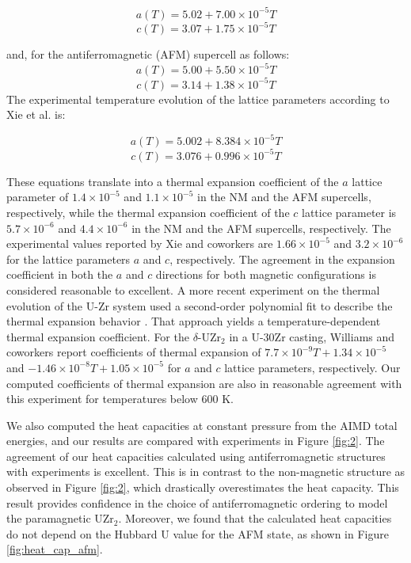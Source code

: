 \documentclass[preprint,12pt]{elsarticle}
\begin{document}
\[
 a(T) = 5.02 + 7.00 \times 10^{-5} T \]
 \[
 c(T) = 3.07 + 1.75 \times 10^{-5} T \]

\noindent and, for the antiferromagnetic (AFM) supercell as follows:
\[
 a(T) = 5.00 + 5.50 \times 10^{-5} T \]
 \[
 c(T) = 3.14 + 1.38 \times 10^{-5} T \]
 The experimental temperature evolution of the lattice parameters according to Xie et al. \cite{xie_phase_2022} is:

 \[
 a(T) = 5.002 + 8.384 \times 10^{-5} T \]
 \[
 c(T) = 3.076 + 0.996 \times 10^{-5} T \]

These equations translate into a thermal expansion coefficient of the $a$ lattice parameter of $1.4 \times 10^{-5}$ and $1.1 \times 10^{-5}$ in the NM and the AFM supercells, respectively, while the thermal expansion coefficient of the $c$ lattice parameter is $5.7 \times 10^{-6}$ and $4.4 \times 10^{-6}$ in the NM and the AFM supercells, respectively. The experimental values reported by Xie and coworkers are $1.66 \times 10^{-5}$   and  $3.2 \times 10^{-6}$  for the lattice parameters $a$ and $c$, respectively. The agreement in the expansion coefficient in both the $a$ and $c$ directions for both magnetic configurations is considered reasonable to excellent. A more recent experiment on the thermal evolution of the U-Zr system used a second-order polynomial fit to describe the thermal expansion behavior \cite{williams_phase_2023}. That approach yields a temperature-dependent thermal expansion coefficient. For the $\delta$-UZr$_2$ in a U-30Zr casting, Williams and coworkers \cite{williams_phase_2023} report coefficients of thermal expansion of $7.7 \times 10^{-9} T + 1.34 \times 10^{-5}$ and $-1.46 \times 10^{-8} T + 1.05 \times 10^{-5}$ for $a$ and $c$  lattice parameters, respectively. Our computed coefficients of thermal expansion are also in reasonable agreement with this experiment for temperatures below 600 K. 


We also computed the heat capacities at constant pressure from the AIMD total energies, and our results are compared with experiments \cite{takahashi_heat_1989, ding_magnetic_2020} in Figure \ref{fig:2}. The agreement of our heat capacities calculated using antiferromagnetic structures with experiments \cite{takahashi_heat_1989} is excellent. This is in contrast to the non-magnetic structure as observed in Figure \ref{fig:2}, which drastically overestimates the heat capacity. This result provides confidence in the choice of antiferromagnetic ordering to model the paramagnetic UZr$_2$. Moreover, we found that the calculated heat capacities do not depend on the Hubbard U value for the AFM state, as shown in Figure \ref{fig:heat_cap_afm}. 
\end{document}
